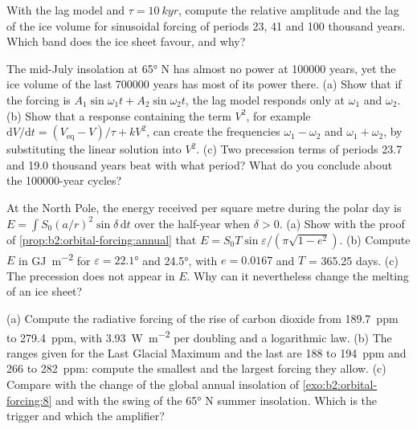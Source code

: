 \begin{exercise}[$\star\star$]\label{exo:b2:orbital-forcing:9}
With the lag model and $\tau = \qty{10}{kyr}$, compute the relative amplitude and the lag of the
ice volume for sinusoidal forcing of periods 23, 41 and \num{100} thousand years. Which band does
the ice sheet favour, and why?
\end{exercise}

\begin{exercise}[$\star\star\star$]\label{exo:b2:orbital-forcing:10}
The mid-July insolation at \ang{65} N has almost no power at \num{100000} years, yet the ice volume
of the last \num{700000} years has most of its power there. (a) Show that if the forcing is $A_1\sin
\omega_1 t + A_2\sin\omega_2 t$, the lag model responds only at $\omega_1$ and $\omega_2$. (b) Show
that a response containing the term $V^2$, for example $\mathrm dV/\mathrm dt = (V_{\mathrm{eq}} -
V)/\tau + kV^2$, can create the frequencies $\omega_1 - \omega_2$ and $\omega_1 + \omega_2$, by
substituting the linear solution into $V^2$. (c) Two precession terms of periods \num{23.7} and
\num{19.0} thousand years beat with what period? What do you conclude about the \num{100000}-year
cycles?
\end{exercise}

\begin{exercise}[$\star\star\star$]\label{exo:b2:orbital-forcing:11}
At the North Pole, the energy received per square metre during the polar day is $E = \int S_0(a/r)^2
\sin\delta\,\mathrm dt$ over the half-year when $\delta > 0$. (a) Show with the proof of
\cref{prop:b2:orbital-forcing:annual} that $E = S_0T\sin\varepsilon/(\pi\sqrt{1 - e^2})$. (b) Compute
$E$ in \unit{GJ.m^{-2}} for $\varepsilon = \ang{22.1}$ and \ang{24.5}, with $e = 0.0167$ and $T$ =
365.25 days. (c) The precession does not appear in $E$. Why can it nevertheless change the
melting of an ice sheet?
\end{exercise}

\begin{exercise}[$\star\star\star$]\label{exo:b2:orbital-forcing:12}
(a) Compute the radiative forcing of the rise of carbon dioxide from \qty{189.7}{ppm} to
\qty{279.4}{ppm}, with \qty{3.93}{W.m^{-2}} per doubling and a logarithmic law. (b) The ranges
given for the Last Glacial Maximum and the last  are 188 to \qty{194}{ppm} and 266 to
\qty{282}{ppm}: compute the smallest and the largest forcing they allow. (c) Compare with the change
of the global annual insolation of \cref{exo:b2:orbital-forcing:8} and with the swing of the
\ang{65} N summer insolation. Which is the trigger and which the amplifier?
\end{exercise}

